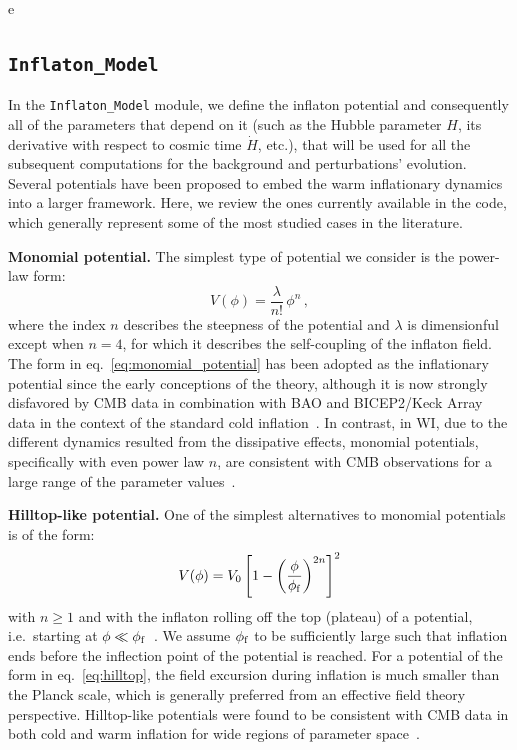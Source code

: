 \documentclass[a4paper,11pt]{article}
\begin{document}
e\subsection{\texttt{Inflaton\_Model}}
\label{sec:Inflaton_Model}

In the \texttt{Inflaton\_Model} module, we define the inflaton potential and consequently all of the parameters that depend on it (such as the Hubble parameter $H$, its derivative with respect to cosmic time $\Dot{H}$, etc.), that will be used for all the subsequent computations for the background and perturbations' evolution. Several potentials have been proposed to embed the warm inflationary dynamics into a larger framework. Here, we review the ones currently available in the code, which generally represent some of the most studied cases in the literature.

{\bf Monomial potential.} The simplest type of potential we consider is the power-law form:
\begin{equation}
    \label{eq:monomial_potential}
    V(\phi)= \frac{\lambda}{n!}\,\phi^n\,,
\end{equation}
where the index $n$ describes the steepness of the potential and $\lambda$ is dimensionful except when $n=4$, for which it describes the self-coupling of the inflaton field. The form in eq.~\eqref{eq:monomial_potential} has been adopted as the inflationary potential since the early conceptions of the theory, although it is now strongly disfavored by CMB data in combination with BAO and BICEP2/Keck Array data in the context of the standard cold inflation~\cite{Planck:2018jri}. In contrast, in WI, due to the different dynamics resulted
from the dissipative effects, monomial potentials, specifically with even  power law $n$, are consistent with CMB observations for a
large range of the parameter values~\cite{Benetti:2016jhf}.

{\bf Hilltop-like potential.} One of the simplest alternatives to monomial potentials is of the form:
\begin{equation}
    V(\phi)=V_0\left[1-\left(\frac{\phi}{\phi_{\rm{f}}}\right)^{2n}\right]^{2}
    \label{eq:hilltop}
\end{equation}
with $n\geq 1$ and with the inflaton rolling off the top (plateau) of a potential, i.e.\ starting at $\phi\ll \phi_{\rm f}$~\cite{Boubekeur:2005zm}.  We assume  $\phi_{\rm f}$ to be sufficiently large such that inflation ends before the inflection point of the potential is reached. For a potential of the form in eq.~\eqref{eq:hilltop}, the field excursion during inflation is much smaller than the Planck scale, which is generally preferred from an effective field theory perspective. Hilltop-like potentials were found to be consistent with CMB data in both cold and warm inflation for wide regions of parameter space~\cite{Bartrum:2013oka,Benetti:2016jhf}.
\end{document}
